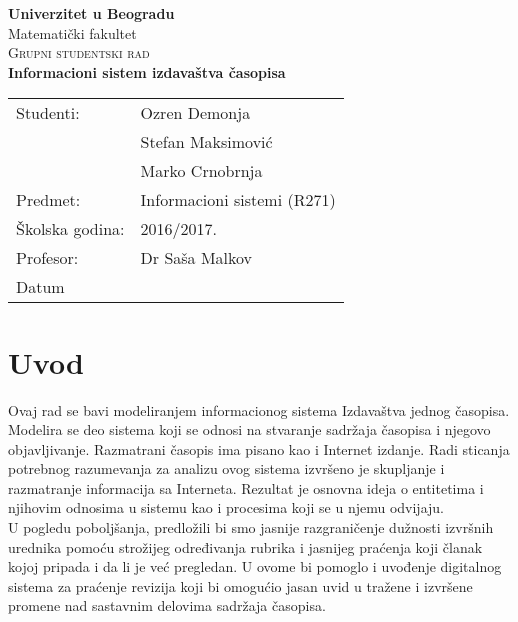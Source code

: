 \documentclass[a4paper,12pt]{extarticle}
\begin{document}
\renewcommand*\contentsname{ }
\begin{titlepage}
\begin{center}

	\textbf{\Large Univerzitet u Beogradu}\\[0.5cm]
	
	{\large Matematički fakultet}\\[6cm]
	
	\textsc{\huge Grupni studentski rad}\\[0.5cm]
	
	\textbf{\Large Informacioni sistem izdavaštva časopisa}\\[10cm]

	\begin{tabular}{|l|l|}
  		\hline
	    Studenti: & Ozren Demonja \\ \cline{2-2}
	              & Stefan Maksimović \\ \cline{2-2}
	              & Marko Crnobrnja \\ \hline
	    Predmet: & Informacioni sistemi (R271) \\ \hline
	    Školska godina: & 2016/2017. \\ \hline
	    Profesor: & Dr Saša Malkov	 \\ \hline
	    Datum &  \\ \hline
	\end{tabular}

\end{center}
\end{titlepage}

\newpage \section{Uvod}

Ovaj rad se bavi modeliranjem informacionog sistema Izdavaštva jednog časopisa. Modelira se deo sistema koji se odnosi na stvaranje sadržaja časopisa i njegovo objavljivanje. Razmatrani časopis ima pisano kao i Internet izdanje. Radi sticanja potrebnog razumevanja za analizu ovog sistema izvršeno je skupljanje i razmatranje informacija sa Interneta. Rezultat je osnovna ideja o entitetima i njihovim odnosima u sistemu kao i procesima koji se u njemu odvijaju. \\

 U pogledu poboljšanja, predložili bi smo jasnije razgraničenje dužnosti izvršnih urednika pomoću strožijeg određivanja rubrika i jasnijeg praćenja koji članak kojoj pripada i da li je već pregledan. U ovome bi pomoglo i uvođenje digitalnog sistema za praćenje revizija koji bi omogućio jasan uvid u tražene i izvršene promene nad sastavnim delovima sadržaja časopisa.\\
\end{document}
